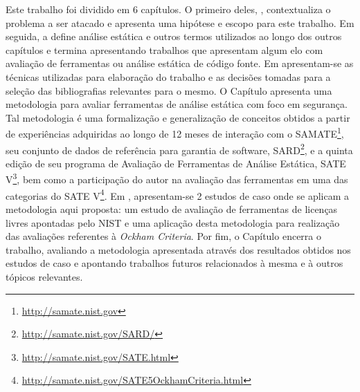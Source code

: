 Este trabalho foi dividido em 6 capítulos. O primeiro deles, , contextualiza o problema a ser atacado e apresenta uma hipótese e escopo para este trabalho. Em seguida, a  define análise estática e outros termos utilizados ao longo dos outros capítulos e termina apresentando trabalhos que apresentam algum elo com avaliação de ferramentas ou análise estática de código fonte. Em  apresentam-se as técnicas utilizadas para elaboração do trabalho e as decisões tomadas para a seleção das bibliografias relevantes para o mesmo. O Capítulo  apresenta uma metodologia para avaliar ferramentas de análise estática com foco em segurança. Tal metodologia é uma formalização e generalização de conceitos obtidos  a partir de experiências adquiridas ao longo de 12 meses de interação com o SAMATE\footnote{\url{http://samate.nist.gov}}, seu conjunto de dados de referência para garantia de software, SARD\footnote{\url{http://samate.nist.gov/SARD/}}, e a quinta edição de seu programa de Avaliação de Ferramentas de Análise Estática, SATE V\footnote{\url{http://samate.nist.gov/SATE.html}}, bem como a participação do autor na avaliação das ferramentas em uma das categorias do SATE V\footnote{\url{http://samate.nist.gov/SATE5OckhamCriteria.html}}. Em , apresentam-se 2 estudos de caso onde se aplicam a metodologia aqui proposta: um estudo de avaliação de ferramentas de licenças livres apontadas pelo NIST e uma aplicação desta metodologia para realização das avaliações referentes à \textit{Ockham Criteria}. Por fim, o Capítulo  encerra o trabalho, avaliando a metodologia apresentada através dos resultados obtidos nos estudos de caso e apontando trabalhos futuros relacionados à mesma e à outros tópicos relevantes.
